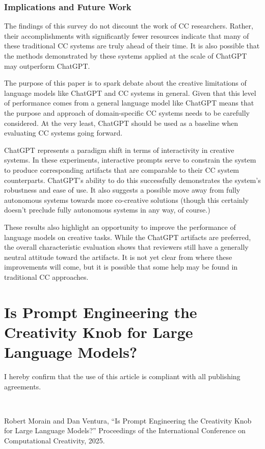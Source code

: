 \documentclass[phd,electronic,oneside,twosidetoc,letterpaper,chaptercenter,parttop,lof]{byumsphd}
\begin{document}
\subsection{Implications and Future Work}
The findings of this survey do not discount the work of CC researchers. 
Rather, their accomplishments with significantly fewer resources indicate that many of these traditional CC systems are truly ahead of their time.
It is also possible that the methods demonstrated by these systems applied at the scale of ChatGPT may outperform ChatGPT.

The purpose of this paper is to spark debate about the creative limitations of language models like ChatGPT and CC systems in general. 
Given that this level of performance comes from a general language model like ChatGPT means that the purpose and approach of domain-specific CC systems needs to be carefully considered. At the very least, ChatGPT should be used as a baseline when evaluating CC systems going forward.

ChatGPT represents a paradigm shift in terms of interactivity in creative systems. 
In these experiments, interactive prompts serve to constrain the system to produce corresponding artifacts that are comparable to their CC system counterparts. 
ChatGPT's ability to do this successfully demonstrates the system's robustness and ease of use. It also suggests a possible move away from fully autonomous systems towards more co-creative solutions (though this certainly doesn't preclude fully autonomous systems in any way, of course.)

These results also highlight an opportunity to improve the performance of language models on creative tasks.
While the ChatGPT artifacts are preferred, the overall characteristic evaluation shows that reviewers still have a generally neutral attitude toward the artifacts. 
It is not yet clear from where these improvements will come, but it is possible that some help may be found in traditional CC approaches. 




\chapter{Is Prompt Engineering the Creativity Knob for Large Language Models?}
\label{chap:cc_prompting}

I hereby confirm that the use of this article is compliant with all publishing agreements.

\

\noindent
Robert Morain and Dan Ventura, ``Is Prompt Engineering the Creativity Knob for Large Language Models?'' Proceedings of the International Conference on Computational Creativity, 2025.
\end{document}
